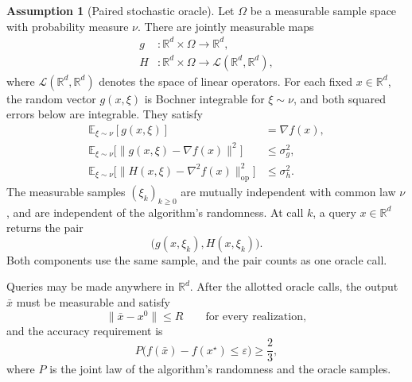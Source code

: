 \documentclass[10pt]{article}
\theoremstyle{definition}
\newtheorem{assumption}{Assumption}
\begin{document}
\begin{assumption}[Paired stochastic oracle]
Let $\Omega$ be a measurable sample space with probability measure $\nu$. There are jointly measurable maps
\[
\begin{aligned}
g &: \mathbb{R}^d\times\Omega\to\mathbb{R}^d,\\
H &: \mathbb{R}^d\times\Omega\to\mathcal{L}(\mathbb{R}^d,\mathbb{R}^d),
\end{aligned}
\]
where $\mathcal{L}(\mathbb{R}^d,\mathbb{R}^d)$ denotes the space of linear operators. For each fixed $x\in\mathbb{R}^d$, the random vector $g(x,\xi)$ is Bochner integrable for $\xi\sim\nu$, and both squared errors below are integrable. They satisfy
\[
\begin{aligned}
\mathbb{E}_{\xi\sim\nu}[g(x,\xi)]&=\nabla f(x),\\
\mathbb{E}_{\xi\sim\nu}\bigl[\|g(x,\xi)-\nabla f(x)\|^2\bigr]
&\leq\sigma_g^2,\\
\mathbb{E}_{\xi\sim\nu}\bigl[\|H(x,\xi)-\nabla^2 f(x)\|_{\mathrm{op}}^2\bigr]
&\leq\sigma_h^2.
\end{aligned}
\]
The measurable samples $(\xi_k)_{k\geq0}$ are mutually independent with common law $\nu$, and are independent of the algorithm's randomness. At call $k$, a query $x\in\mathbb{R}^d$ returns the pair
\[
\bigl(g(x,\xi_k),H(x,\xi_k)\bigr).
\]
Both components use the same sample, and the pair counts as one oracle call.
\end{assumption}

Queries may be made anywhere in $\mathbb{R}^d$. After the allotted oracle calls, the output $\bar{x}$ must be measurable and satisfy
\[
\|\bar{x}-x^0\|\leq R
\qquad\text{for every realization},
\]
and the accuracy requirement is
\[
P\bigl(f(\bar{x})-f(x^\star)\leq\varepsilon\bigr)\geq\frac{2}{3},
\]
where $P$ is the joint law of the algorithm's randomness and the oracle samples.
\end{document}
